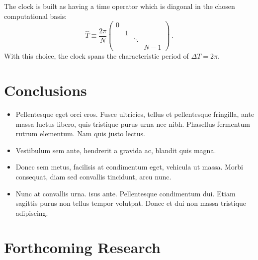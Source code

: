 \documentclass[a0,portrait]{a0poster}
\DeclareMathOperator*{\repr}{\equiv}      %
\begin{document}
\begin{multicols}{2}
The clock is built as having a time operator which is diagonal in the
chosen computational basis:
\[
  \hat{T} \repr \frac{2\pi}{N}
  \begin{pmatrix}
    0           &       &       &       \\
                &1      &       &       \\
                &       &\ddots &       \\
                &       &       &N-1
  \end{pmatrix} \,\text{.}
\]
With this choice, the clock spans the characteristic period of $\Delta T = 2\pi$.


\color{SaddleBrown} %

\section*{Conclusions}

\begin{itemize}
\item Pellentesque eget orci eros. Fusce ultricies, tellus et pellentesque fringilla, ante massa luctus libero, quis tristique purus urna nec nibh. Phasellus fermentum rutrum elementum. Nam quis justo lectus.
\item Vestibulum sem ante, hendrerit a gravida ac, blandit quis magna.
\item Donec sem metus, facilisis at condimentum eget, vehicula ut massa. Morbi consequat, diam sed convallis tincidunt, arcu nunc.
\item Nunc at convallis urna. isus ante. Pellentesque condimentum dui. Etiam sagittis purus non tellus tempor volutpat. Donec et dui non massa tristique adipiscing.
\end{itemize}

\color{DarkSlateGray} %


\section*{Forthcoming Research}


\end{multicols}
\end{document}
